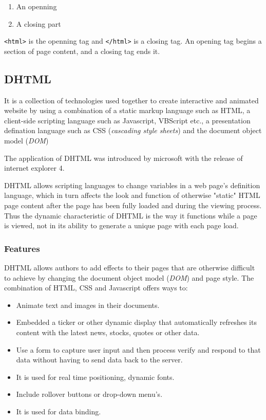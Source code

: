 \documentclass[a4paper]{article}
\begin{document}
  \begin{enumerate}
    \item An openning
    \item A closing part
  \end{enumerate}

  \texttt{<html>} is the openning tag and \texttt{</html>} is a closing
  tag. An opening tag begins a section of page content, and a closing 
  tag ends it.%

  \subsection{DHTML}%
  It is a collection of technologies used together to create interactive
  and animated website by using a combination of a static markup language
  such as HTML, a client-side scripting language such as Javascript, 
  VBScript etc., a presentation defination language such as CSS (\emph
  {cascading style sheets}) and the document object model (\emph
  {DOM})

  The application of DHTML was introduced by microsoft with the release
  of internet explorer 4.

  DHTML allows scripting languages to change variables in a web page's 
  definition language, which in turn affects the look and function of 
  otherwise "static" HTML page content after the page has been fully 
  loaded and during the viewing process. Thus the dynamic characteristic 
  of DHTML is the way it functions while a page is viewed, not in its 
  ability to generate a unique page with each page load.
    \subsubsection{Features}
    DHTML allows authors to add effects to their pages that are otherwise
    difficult to achieve by changing the document object model (\emph{DOM})
    and page style. The combination of HTML, CSS and Javascript offers
    ways to:
    \begin{itemize}
      \item Animate text and images in their documents.
      \item Embedded a ticker or other dynamic display that automatically
        refreshes its content with the latest news, stocks, quotes or 
        other data.
      \item Use a form to capture user input and then process verify
        and respond to that data without having to send data back to the 
        server.
      \item It is used for real time positioning, dynamic fonts.
      \item Include rollover buttons or drop-down menu's.
      \item It is used for data binding.
    \end{itemize}%
\end{document}
